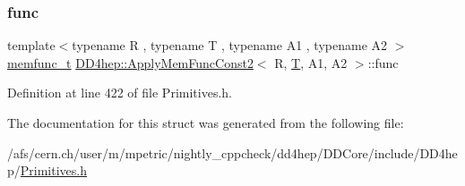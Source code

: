 \subsubsection{\texorpdfstring{func}{func}}
{\footnotesize\ttfamily template$<$typename R , typename T , typename A1 , typename A2 $>$ \\
\hyperlink{struct_d_d4hep_1_1_apply_mem_func_const2_ac0e4dae57560aa3d5f8d489605c714e3}{memfunc\+\_\+t} \hyperlink{struct_d_d4hep_1_1_apply_mem_func_const2}{D\+D4hep\+::\+Apply\+Mem\+Func\+Const2}$<$ R, \hyperlink{class_t}{T}, A1, A2 $>$\+::func}



Definition at line 422 of file Primitives.\+h.



The documentation for this struct was generated from the following file\+:\begin{DoxyCompactItemize}
\item 
/afs/cern.\+ch/user/m/mpetric/nightly\+\_\+cppcheck/dd4hep/\+D\+D\+Core/include/\+D\+D4hep/\hyperlink{_primitives_8h}{Primitives.\+h}\end{DoxyCompactItemize}
